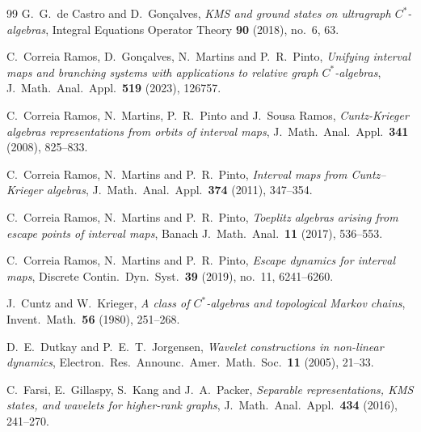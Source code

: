 \documentclass[12pt, reqno]{amsart}
\theoremstyle{definition}
\theoremstyle{remark}
\numberwithin{equation}{section}
\begin{document}
\begin{thebibliography}{99}
G.\ G.\ de Castro and D.\ Gon\c{c}alves,
\textit{KMS and ground states on ultragraph $C^*$-algebras},
Integral Equations Operator Theory \textbf{90} (2018), no.\ 6, 63.

C.\ Correia Ramos, D.\ Gon\c{c}alves, N.\ Martins and P.\ R.\ Pinto,
\textit{Unifying interval maps and branching systems with applications to relative graph $C^*$-algebras},
J.\ Math.\ Anal.\ Appl.\ \textbf{519} (2023), 126757.

C.\ Correia Ramos, N.\ Martins, P.\ R.\ Pinto and J.\ Sousa Ramos,
\textit{Cuntz-Krieger algebras representations from orbits of interval maps},
J.\ Math.\ Anal.\ Appl.\ \textbf{341} (2008), 825--833.

C.\ Correia Ramos, N.\ Martins and P.\ R.\ Pinto,
\textit{Interval maps from Cuntz--Krieger algebras},
J.\ Math.\ Anal.\ Appl.\ \textbf{374} (2011), 347--354.

C.\ Correia Ramos, N.\ Martins and P.\ R.\ Pinto,
\textit{Toeplitz algebras arising from escape points of interval maps},
Banach J.\ Math.\ Anal.\ \textbf{11} (2017), 536--553.

C.\ Correia Ramos, N.\ Martins and P.\ R.\ Pinto,
\textit{Escape dynamics for interval maps},
Discrete Contin.\ Dyn.\ Syst.\ \textbf{39} (2019), no.\ 11, 6241--6260.

J.\ Cuntz and W.\ Krieger,
\textit{A class of $C^*$-algebras and topological Markov chains},
Invent.\ Math.\ \textbf{56} (1980), 251--268.

D.\ E.\ Dutkay and P.\ E.\ T.\ Jorgensen,
\textit{Wavelet constructions in non-linear dynamics},
Electron.\ Res.\ Announc.\ Amer.\ Math.\ Soc.\ \textbf{11} (2005), 21--33.


C.\ Farsi, E.\ Gillaspy, S.\ Kang and J.\ A.\ Packer,
\textit{Separable representations, KMS states, and wavelets for higher-rank graphs},
J.\ Math.\ Anal.\ Appl.\ \textbf{434} (2016), 241--270.


\end{thebibliography}
\end{document}
